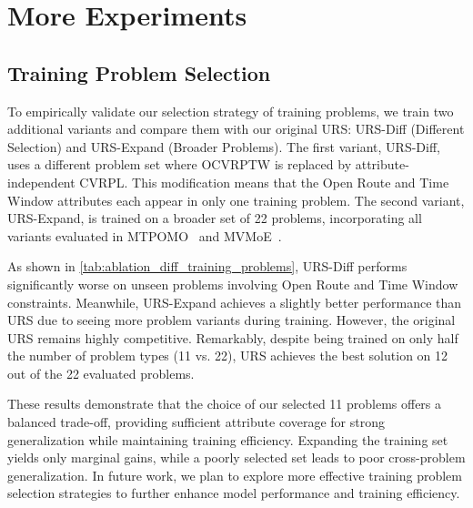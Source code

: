 \documentclass{article}
\theoremstyle{plain}
\theoremstyle{definition}
\theoremstyle{remark}
\begin{document}
\clearpage

\section{More Experiments}
\subsection{Training Problem Selection}
\label{append:problem_selection}
To empirically validate our selection strategy of training problems, we train two additional variants and compare them with our original URS: URS-Diff (Different Selection) and URS-Expand (Broader Problems). The first variant, URS-Diff, uses a different problem set where OCVRPTW is replaced by attribute-independent CVRPL. This modification means that the Open Route and Time Window attributes each appear in only one training problem. The second variant, URS-Expand, is trained on a broader set of 22 problems, incorporating all variants evaluated in MTPOMO~\citep{liu2024mtpomo} and MVMoE~\citep{zhou2024mvmoe}.

As shown in \cref{tab:ablation_diff_training_problems}, URS-Diff performs significantly worse on unseen problems involving Open Route and Time Window constraints. Meanwhile, URS-Expand achieves a slightly better performance than URS due to seeing more problem variants during training. However, the original URS remains highly competitive. Remarkably, despite being trained on only half the number of problem types (11 vs. 22), URS achieves the best solution on 12 out of the 22 evaluated problems.

These results demonstrate that the choice of our selected 11 problems offers a balanced trade-off, providing sufficient attribute coverage for strong generalization while maintaining training efficiency. Expanding the training set yields only marginal gains, while a poorly selected set leads to poor cross-problem generalization. In future work, we plan to explore more effective training problem selection strategies to further enhance model performance and training efficiency.
\end{document}
